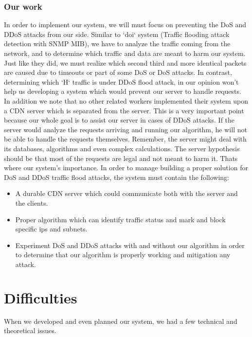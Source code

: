 \documentclass{report}
\begin{document}
\subsection {Our work }
In order to implement our system, we will must focus on preventing the  \gls{DoS} and \gls{DDoS} attacks from our side.\hfill \break
Similar to `doi` system (Traffic flooding attack detection with \gls{SNMP} MIB), we have to analyze the traffic coming from the network, \hfill \break
 and to determine which traffic and data are meant to harm our system. Just like they did, we must realize which second third and more identical packets are caused due to timeouts or part of some \gls{DoS} or \gls{DoS} attacks.\hfill \break
In contrast, determining which `H` traffic is under \gls{DDoS} flood attack, in our opinion won't help us developing a system which would prevent our server to handle requests.\hfill \break
In addition we note that no other related workers implemented their system upon a \gls{CDN} server which is separated from the server. \hfill \break
This is a very important point because our whole goal is to assist our server in cases of \gls{DDoS} attacks.\hfill \break
 If the server would analyze the requests arriving and running our algorithm, he will not be able to handle the requests themselves. \hfill \break
 Remember, the server might deal with its databases, algorithms and even complex calculations. The server hypothesis should be that most of the requests are legal and not meant to harm it. \hfill \break
Thats where our system's importance.
In order to manage building a proper solution for \gls{DoS} and \gls{DDoS} traffic flood attacks, the system must contain the following:
\begin{itemize}
\item A durable \gls{CDN} server which could communicate both with the server and the clients.
\item Proper algorithm which can identify traffic status and mark and block specific ips and subnets.
\item Experiment \gls{DoS} and \gls{DDoS} attacks with and without our algorithm in order to determine that our algorithm is properly working and mitigation any attack.
\end{itemize}
\newpage
\chapter {Difficulties}
When we developed and even planned our system, we had a few technical and theoretical issues. 
\end{document}
